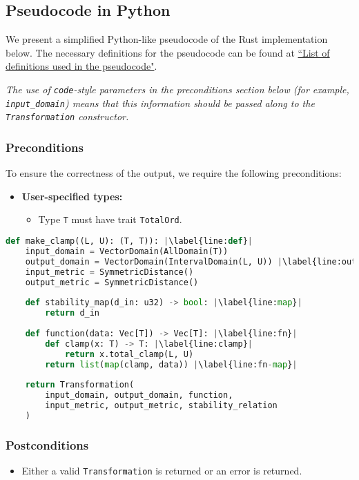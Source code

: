 \documentclass{article}
\begin{document}
\subsection{Pseudocode in Python}\label{sec:pseudocode}
We present a simplified Python-like pseudocode of the Rust implementation below. The necessary definitions for the pseudocode can be found at \href{https://www.overleaf.com/project/60d215bf90b337ac02200a99}{``List of definitions used in the pseudocode"}. 

\emph{The use of \texttt{code}-style parameters in the preconditions section below (for example, \texttt{input\_domain}) means that this information should be passed along to the \texttt{Transformation} constructor.}

\subsubsection*{Preconditions}
To ensure the correctness of the output, we require the following preconditions:

\begin{itemize}
    \item \textbf{User-specified types:}
    \begin{itemize}
        \item Type \texttt{T} must have trait \texttt{TotalOrd}.
    \end{itemize}
\end{itemize}


\begin{lstlisting}[language=Python, escapechar=|] 
def make_clamp((L, U): (T, T)): |\label{line:def}|
    input_domain = VectorDomain(AllDomain(T))
    output_domain = VectorDomain(IntervalDomain(L, U)) |\label{line:output}|
    input_metric = SymmetricDistance()
    output_metric = SymmetricDistance()
    
    def stability_map(d_in: u32) -> bool: |\label{line:map}|
        return d_in
    
    def function(data: Vec[T]) -> Vec[T]: |\label{line:fn}|
        def clamp(x: T) -> T: |\label{line:clamp}|
            return x.total_clamp(L, U)
        return list(map(clamp, data)) |\label{line:fn-map}|
    
    return Transformation(
        input_domain, output_domain, function, 
        input_metric, output_metric, stability_relation
    )
\end{lstlisting}

\subsubsection*{Postconditions}
\begin{itemize}
    \item Either a valid \texttt{Transformation} is returned or an error is returned.
\end{itemize}
\end{document}
